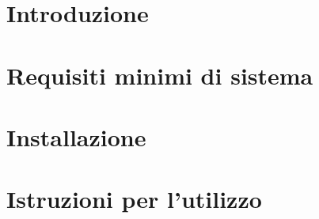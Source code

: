 \documentclass[]{article}
\begin{document}
	
	\newpage
	\tableofcontents
	\newpage
	\listoffigures
	\listoftables
	\newpage


	\section{Introduzione}
	
	\newpage
	\section{Requisiti minimi di sistema}
	
	\newpage
	\section{Installazione}
	
	\newpage
	\section{Istruzioni per l'utilizzo}
	
	\newpage


	
	
\end{document}

